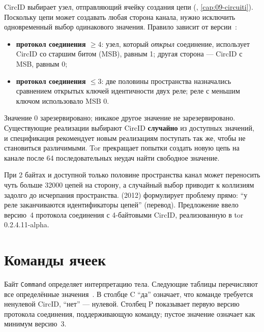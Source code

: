 CircID выбирает узел, отправляющий ячейку создания цепи (, \cref{cap:09-circuiti}). Поскольку цепи может создавать любая сторона канала, нужно исключить одновременный выбор одинакового значения. Правило зависит от версии~:
\begin{itemize}
  \item \textbf{протокол соединения $\ge 4$}: узел, который \emph{открыл} соединение, использует CircID со старшим битом (MSB), равным 1; другая сторона --- CircID с MSB, равным 0;
  \item \textbf{протокол соединения $\le 3$}: две половины пространства назначались сравнением открытых ключей идентичности двух реле; реле с меньшим ключом использовало MSB 0.
\end{itemize}
Значение 0 зарезервировано; никакое другое значение не зарезервировано. Существующие реализации выбирают CircID \textbf{случайно} из доступных значений, и спецификация рекомендует новым реализациям поступать так же, чтобы не становиться различимыми. Tor прекращает попытки создать новую цепь на канале после 64 последовательных неудач найти свободное значение.

\begin{approfondimento}
При 2 байтах и доступной только половине пространства канал может переносить чуть больше \num{32000} цепей на сторону, а случайный выбор приводит к коллизиям задолго до исчерпания пространства.  (2012) формулирует проблему прямо: \enquote{у реле заканчиваются идентификаторы цепей} (перевод). Предложение ввело версию~4 протокола соединения с 4-байтовыми CircID, реализованную в tor 0.2.4.11-alpha.
\end{approfondimento}

\section{Команды ячеек}\label{sec:comandi}

Байт \texttt{Command} определяет интерпретацию тела. Следующие таблицы перечисляют все определённые значения~. В столбце C \enquote{да} означает, что команде требуется ненулевой CircID, \enquote{нет} --- нулевой. Столбец P показывает первую версию протокола соединения, поддерживающую команду; пустое значение означает как минимум версию~3.

